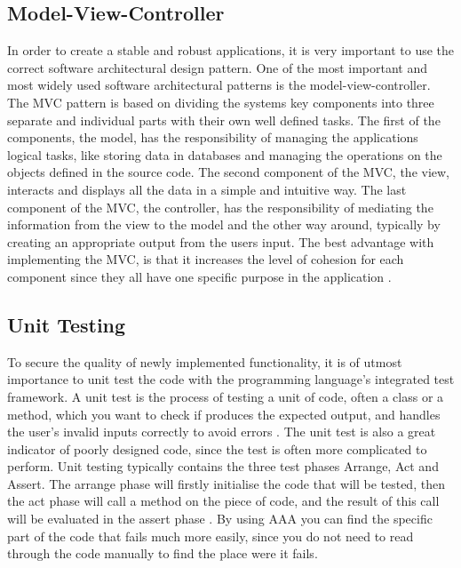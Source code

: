 \documentclass[British]{article}
\begin{document}

\subsection{Model-View-Controller}
In order to create a stable and robust applications, it is very important to use the correct software architectural design pattern. One of the most important and most widely used software architectural patterns is the model-view-controller. The MVC pattern is based on dividing the systems key components into three separate and individual parts with their own well defined tasks. The first of the components, the model, has the responsibility of managing the applications logical tasks, like storing data in databases and managing the operations on the objects defined in the source code. The second component of the MVC, the view, interacts and displays all the data in a simple and intuitive way. The last component of the MVC, the controller, has the responsibility of mediating the information from the view to the model and the other way around, typically by creating an appropriate output from the users input. The best advantage with implementing the MVC, is that it increases the level of cohesion for each component since they all have one specific purpose in the application \cite{redhat2020}.

\subsection{Unit Testing}
To secure the quality of newly implemented functionality, it is of utmost importance to unit test the code with the programming language's integrated test framework. A unit test is the process of testing a unit of code, often a class or a method, which you want to check if produces the expected output, and handles the user's invalid inputs correctly to avoid errors \cite[pp.~295-296]{barnes2017objects}. The unit test is also a great indicator of poorly designed code, since the test is often more complicated to perform. Unit testing typically contains the three test phases Arrange, Act and Assert. The arrange phase will firstly initialise the code that will be tested, then the act phase will call a method on the piece of code, and the result of this call will be evaluated in the assert phase \cite{toptal2023}. By using AAA you can find the specific part of the code that fails much more easily, since you do not need to read through the code manually to find the place were it fails.
\end{document}
